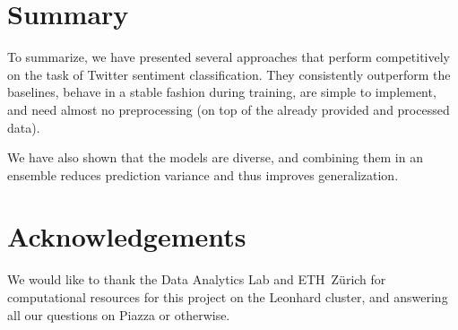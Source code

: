 \documentclass[10pt,conference,compsocconf]{IEEEtran}
\begin{document}
\section{Summary}
To summarize, we have presented several approaches that perform competitively on the task of Twitter sentiment classification.
They consistently outperform the baselines, behave in a stable fashion during training, are simple to implement, and need almost no preprocessing (on top of the already provided and processed data).

We have also shown that the models are diverse, and combining them in an ensemble reduces prediction variance and thus improves generalization.

\section*{Acknowledgements}

We would like to thank the Data Analytics Lab and ETH~Z\"{u}rich for computational resources for this project on the Leonhard cluster, and answering all our questions on Piazza or otherwise.





\end{document}
